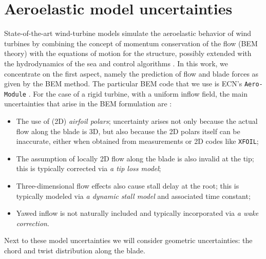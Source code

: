 \section{Aeroelastic model uncertainties}\label{sec:model_description}
State-of-the-art wind-turbine models simulate the aeroelastic behavior of wind turbines by combining the concept of momentum conservation of the flow (BEM theory) with the equations of motion for the structure, possibly extended with the hydrodynamics of the sea and control algorithms \cite{Vorpahl2013}. In this work, we concentrate on the first aspect, namely the prediction of flow and blade forces as given by the BEM method. The particular BEM code that we use is ECN's \texttt{Aero-Module} \cite{Boorsma2012}. For the case of a rigid turbine, with a uniform inflow field, the main uncertainties that arise in the BEM formulation are \cite{Hansen1993}:
\begin{itemize}
\item The use of (2D) \textit{airfoil polars}; uncertainty arises not only because the actual flow along the blade is 3D, but also because the 2D polars itself can be inaccurate, either when obtained from measurements or 2D codes like \texttt{XFOIL};
\item The assumption of locally 2D flow along the blade is also invalid at the tip; this is typically corrected via \textit{a tip loss model};
\item Three-dimensional flow effects also cause stall delay at the root; this is typically modeled via \textit{a dynamic stall model} and associated time constant;
\item Yawed inflow is not naturally included and typically incorporated via \textit{a wake correction}.
\end{itemize}
Next to these model uncertainties we will consider geometric uncertainties: the chord and twist distribution along the blade.


